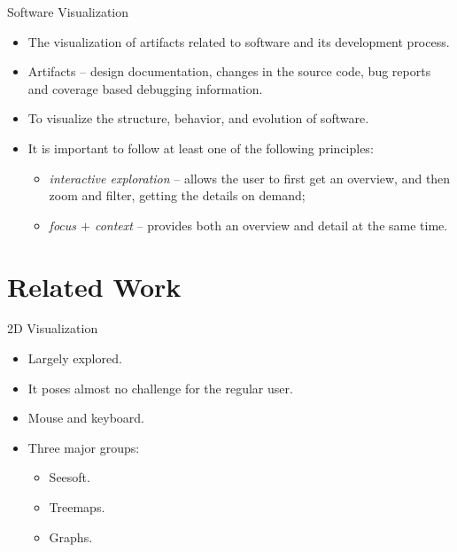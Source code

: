 \documentclass[handout]{beamer}
\begin{document}
\begin{frame}{Software Visualization}

    \begin{itemize}
        \item The visualization of artifacts related to software and its
        development process.
        \item Artifacts -- design documentation, changes in the source code, bug
        reports and coverage based debugging information.
        \item To visualize the structure, behavior, and evolution of software.
        \item It is important to follow at least one of the following
        principles:
        \begin{itemize}
            \item \textit{interactive exploration} -- allows the user to
            first get an overview, and then zoom and filter, getting the details on demand;
            \item \textit{focus $+$ context} -- provides both an overview
            and detail at the same time.
        \end{itemize}
    \end{itemize}
\end{frame}

\section{Related Work}

\begin{frame}
    \sectionpage
\end{frame}

\begin{frame}{2D Visualization}
    \begin{itemize}
        \item Largely explored.
        \item It poses almost no challenge for the regular user.
        \item Mouse and keyboard.
        \item Three major groups:
        \begin{itemize}
            \item Seesoft.
            \item Treemaps.
            \item Graphs.
        \end{itemize}
    \end{itemize}
\end{frame}
\end{document}
